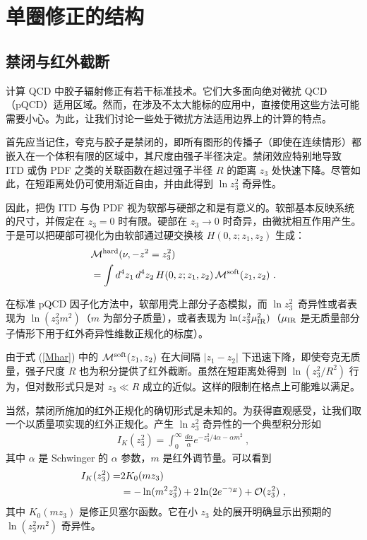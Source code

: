 \section{单圈修正的结构}

\subsection{禁闭与红外截断}

计算 QCD 中胶子辐射修正有若干标准技术。它们大多面向绝对微扰 QCD（pQCD）适用区域。然而，在涉及不太大能标的应用中，直接使用这些方法可能需要小心。为此，让我们讨论一些处于微扰方法适用边界上的计算的特点。

首先应当记住，夸克与胶子是禁闭的，即所有图形的传播子（即使在连续情形）都嵌入在一个体积有限的区域中，其尺度由强子半径决定。禁闭效应特别地导致 ITD 或伪 PDF 之类的关联函数在超过强子半径 $R$ 的距离 $z_3$ 处快速下降。尽管如此，在短距离处仍可使用渐近自由，并由此得到 $\ln z_3^2$ 奇异性。

因此，把伪 ITD 与伪 PDF 视为软部与硬部之和是有意义的。软部基本反映系统的尺寸，并假定在 $z_3=0$ 时有限。硬部在 \mbox{$z_3 \to 0$} 时奇异，由微扰相互作用产生。于是可以把硬部可视化为由软部通过硬交换核 $H (0,z; z_1, z_2)$ 生成：
\begin{align}
    & {\cal M}^{\rm   hard} (\nu, -z^2=z_3^2)
    \nonumber \\  & =   \int d^4z_1 \, d^4 z_2 \, H (0,z; z_1, z_2) \,  {\cal M}^{\rm  soft} (z_1,z_2)\  .
\label{Mhar}
\end{align}

在标准 pQCD 因子化方法中，软部用壳上部分子态模拟，而 \mbox{$\ln z_3^2$ 奇异性}或者表现为 $\ln (z_3^2 m^2)$（$m$ 为部分子质量），或者表现为 $\ln (z_3^2 \mu_{\rm IR}^2)$（$\mu_{\rm IR}$ 是无质量部分子情形下用于红外奇异性维数正规化的标度）。

由于式 (\ref{Mhar}) 中的 ${\cal  M}^{\rm  soft} (z_1,z_2)$ 在大间隔 $|z_1-z_2|$ 下迅速下降，即使夸克无质量，强子尺度 $R$ 也为积分提供了红外截断。虽然在短距离处得到 $\ln (z_3^2 / R^2)$ 行为，但对数形式只是对 $z_3 \ll R$ 成立的近似。这样的限制在格点上可能难以满足。

当然，禁闭所施加的红外正规化的确切形式是未知的。为获得直观感受，让我们取一个以质量项实现的红外正规化。产生 $\ln z_3^2$ 奇异性的一个典型积分形如
   \begin{align}
  I_K (z_3^2) = \int_0^\infty \frac{d\alpha}{\alpha} e^{-z_3^2/4\alpha -   \alpha m^2} \ ,
  \label{IK}
     \end{align}
其中 $\alpha$ 是 Schwinger 的 $\alpha$ 参数，$m$ 是红外调节量。可以看到
   \begin{align}
  I_K (z_3^2) = &2 K_0 (mz_3) \nonumber \\  & = - \ln (m^2 z_3^2) + 2 \ln (2e^{-  \gamma_E })+ {\cal O} (z_3^2)  \  ,
  \label{Kexp}
     \end{align}
其中 $K_0(mz_3)$ 是修正贝塞尔函数。它在小 $z_3$ 处的展开明确显示出预期的 $\ln (z_3^2 m^2)$ 奇异性。

